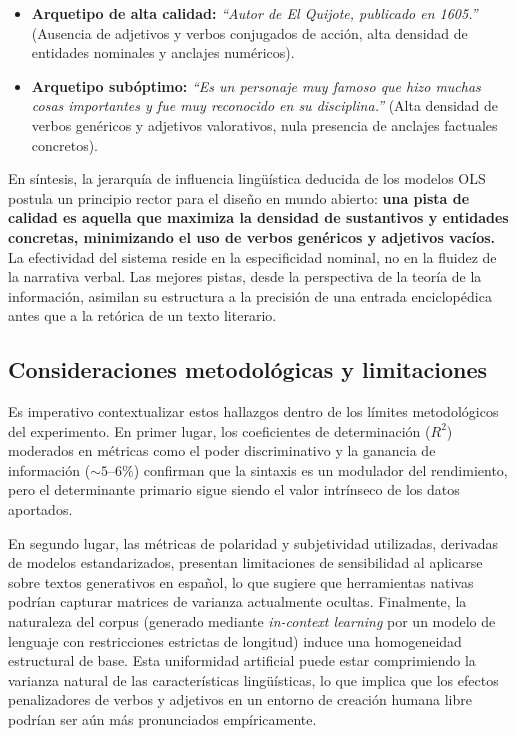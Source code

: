\documentclass[../main.tex]{subfiles}
\begin{document}
\begin{itemize}
\item \textbf{Arquetipo de alta calidad:} \textit{``Autor de El Quijote, publicado en 1605.''} (Ausencia de adjetivos y verbos conjugados de acción, alta densidad de entidades nominales y anclajes numéricos).
\item \textbf{Arquetipo subóptimo:} \textit{``Es un personaje muy famoso que hizo muchas cosas importantes y fue muy reconocido en su disciplina.''} (Alta densidad de verbos genéricos y adjetivos valorativos, nula presencia de anclajes factuales concretos).
\end{itemize}

En síntesis, la jerarquía de influencia lingüística deducida de los modelos OLS postula un principio rector para el diseño en mundo abierto: \textbf{una pista de calidad es aquella que maximiza la densidad de sustantivos y entidades concretas, minimizando el uso de verbos genéricos y adjetivos vacíos.} La efectividad del sistema reside en la especificidad nominal, no en la fluidez de la narrativa verbal. Las mejores pistas, desde la perspectiva de la teoría de la información, asimilan su estructura a la precisión de una entrada enciclopédica antes que a la retórica de un texto literario.

\subsection{Consideraciones metodológicas y limitaciones}

Es imperativo contextualizar estos hallazgos dentro de los límites metodológicos del experimento. En primer lugar, los coeficientes de determinación ($R^2$) moderados en métricas como el poder discriminativo y la ganancia de información ($\sim 5\text{--}6\%$) confirman que la sintaxis es un modulador del rendimiento, pero el determinante primario sigue siendo el valor intrínseco de los datos aportados. 

En segundo lugar, las métricas de polaridad y subjetividad utilizadas, derivadas de modelos estandarizados, presentan limitaciones de sensibilidad al aplicarse sobre textos generativos en español, lo que sugiere que herramientas nativas podrían capturar matrices de varianza actualmente ocultas. Finalmente, la naturaleza del corpus (generado mediante \textit{in-context learning} por un modelo de lenguaje con restricciones estrictas de longitud) induce una homogeneidad estructural de base. Esta uniformidad artificial puede estar comprimiendo la varianza natural de las características lingüísticas, lo que implica que los efectos penalizadores de verbos y adjetivos en un entorno de creación humana libre podrían ser aún más pronunciados empíricamente.
\end{document}
